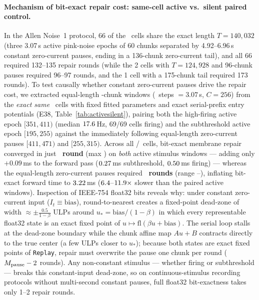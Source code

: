 \documentclass[10pt]{article}
\theoremstyle{remark}
\begin{document}
\paragraph{Mechanism of bit-exact repair cost: same-cell active vs.\ silent paired control.}
In the Allen Noise~1 protocol, 66 of the \RealAuditCells\ cells share the exact length $T=140{,}032$ (three 3.07\,s active pink-noise epochs of 60 chunks separated by 4.92--6.96\,s constant zero-current pauses, ending in a 136-chunk zero-current tail), and all 66 required 132--135 repair rounds (while the 2 cells with $T=124{,}928$ and 96-chunk pauses required 96--97 rounds, and the 1 cell with a 175-chunk tail required 173 rounds).
To test causally whether constant zero-current pauses drive the repair cost, we extracted equal-length \WinCtrlChunks-chunk windows (\WinCtrlSteps\ steps $=3.07$\,s, $C=256$) from the \emph{exact same} \WinCtrlCells\ cells with fixed fitted parameters and exact serial-prefix entry potentials (E38, Table~\ref{tab:activesilent}), pairing both the high-firing active epoch $[351,411)$ (median $17.6$\,Hz, 69/69 cells firing) and the subthreshold active epoch $[195,255)$ against the immediately following equal-length zero-current pauses $[411,471)$ and $[255,315)$.
Across all \WinCtrlLateSilGtAct/\WinCtrlCells\ cells, bit-exact membrane repair converged in just \textbf{\WinCtrlLateActRepMed\ round} (max \WinCtrlLateActRepMax) on \emph{both} active stimulus windows --- adding only $+0.09$\,ms to the forward pass ($0.27$\,ms subthreshold, $0.50$\,ms firing) --- whereas the equal-length zero-current pauses required \textbf{\WinCtrlLateSilRepMed\ rounds} (range \WinCtrlLateSilRepMin--\WinCtrlLateSilRepMax), inflating bit-exact forward time to $3.22$\,ms ($6.4$--$11.9\times$ slower than the paired active windows).
Inspection of IEEE-754 float32 bits reveals why: under constant zero-current input ($I_t\equiv\text{bias}$), round-to-nearest creates a fixed-point dead-zone of width $\approx\pm\frac{0.5}{1-\beta}$ ULPs around $u_*=\text{bias}/(1-\beta)$ in which every representable float32 state is an exact fixed point of $u\mapsto\mathrm{fl}(\beta u+\text{bias})$.
The serial loop stalls at the dead-zone boundary while the chunk affine map $Au+B$ contracts directly to the true center (a few ULPs closer to $u_*$); because both states are exact fixed points of \texttt{Replay}, repair must overwrite the pause one chunk per round ($M_{\rm pause}-2$ rounds).
Any non-constant stimulus --- whether firing or subthreshold --- breaks this constant-input dead-zone, so on continuous-stimulus recording protocols without multi-second constant pauses, full float32 bit-exactness takes only 1--2 repair rounds.
\end{document}
